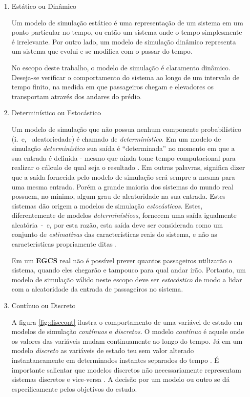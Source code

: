 \begin{enumerate}
\item Estático ou Dinâmico

Um modelo de simulação estático é uma representação de um sistema em um ponto
particular no tempo, ou então um sistema onde o tempo simplesmente é
irrelevante. Por outro lado, um modelo de simulação dinâmico representa um
sistema que evolui e se modifica com o passar do tempo.

No escopo deste trabalho, o modelo de simulação é claramento dinâmico. Deseja-se
verificar o comportamento do sistema ao longo de um intervalo de tempo finito,
na medida em que passageiros chegam e elevadores os transportam através dos
andares do prédio.

\item Determinístico ou Estocástico

Um modelo de simulação que não possua nenhum componente probabilístico (i.~e,~
aleatoriedade) é chamado de \textit{determinístico}. Em um modelo de simulação
\textit{determinístico} sua saída é ``determinada'' no momento em que a sua
entrada é definida - mesmo que ainda tome tempo computacional para realizar o
cálculo de qual seja o resultado \cite{Law}. Em outras palavras, significa dizer
que a saída fornecida pelo modelo de simulação será sempre a mesma para uma
mesma entrada. Porém a grande maioria dos sistemas do mundo real possuem, no
mínimo, algum grau de aleatoridade na sua entrada. Estes sistemas dão origem a
modelos de simulação \textit{estocásticos}. Estes, diferentemente de modelos
\textit{determinísticos}, fornecem uma saída igualmente aleatória~-~e, por esta
razão, esta saída deve ser considerada como um conjunto de \textit{estimativas}
das características reais do sistema, e não as características propriamente
ditas \cite{Banks}.

Em um \textbf{EGCS} real não é possível prever quantos passageiros utilizarão o
sistema, quando eles chegarão e tampouco para qual andar irão. Portanto, um
modelo de simulação válido neste escopo deve ser \textit{estocástico} de modo a
lidar com a aleatoridade da entrada de passageiros no sistema.

\item Contínuo ou Discreto

A figura \ref{fig:disccont} ilustra o comportamento de uma variável de estado em
modelos de simulação \textit{contínuos} e \textit{discretos}. O modelo
\textit{contínuo} é aquele onde os valores das variáveis mudam continuamente ao
longo do tempo. Já em um modelo \textit{discreto} as variáveis de estado teu sem
valor alterado instantaneamente em determinados instantes separados do tempo
\cite{Banks}. É importante salientar que modelos discretos não necessariamente
representam sistemas discretos e vice-versa \cite{Law}. A decisão por um modelo
ou outro se dá especificamente pelos objetivos do estudo.


\end{enumerate}
